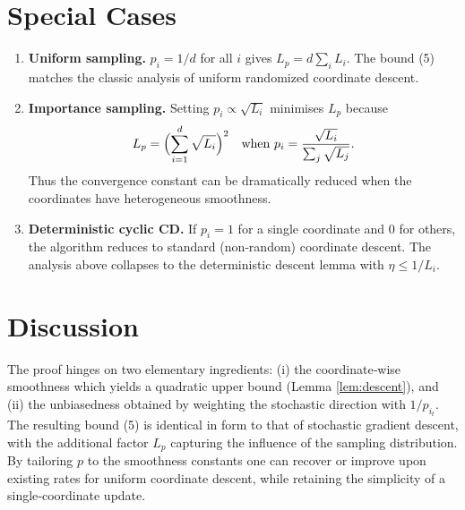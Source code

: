 \documentclass{article}
\begin{document}
\section*{Special Cases}
\begin{enumerate}[label=(\alph*)]
\item \textbf{Uniform sampling.} $p_i=1/d$ for all $i$ gives $L_{p}=d\sum_i L_i$. The bound (5) matches the classic analysis of uniform randomized coordinate descent.
\item \textbf{Importance sampling.} Setting $p_i\propto\sqrt{L_i}$ minimises $L_{p}$ because
\[
L_{p}=\Bigl(\sum_{i=1}^{d}\sqrt{L_i}\Bigr)^{2}
\quad\text{when }p_i=\frac{\sqrt{L_i}}{\sum_j\sqrt{L_j}}.
\]
Thus the convergence constant can be dramatically reduced when the coordinates have heterogeneous smoothness.
\item \textbf{Deterministic cyclic CD.} If $p_i=1$ for a single coordinate and $0$ for others, the algorithm reduces to standard (non‑random) coordinate descent. The analysis above collapses to the deterministic descent lemma with $\eta\le 1/L_i$.
\end{enumerate}

\section*{Discussion}
The proof hinges on two elementary ingredients: (i) the coordinate‑wise smoothness which yields a quadratic upper bound (Lemma \ref{lem:descent}), and (ii) the unbiasedness obtained by weighting the stochastic direction with $1/p_{i_t}$. The resulting bound (5) is identical in form to that of stochastic gradient descent, with the additional factor $L_{p}$ capturing the influence of the sampling distribution. By tailoring $p$ to the smoothness constants one can recover or improve upon existing rates for uniform coordinate descent, while retaining the simplicity of a single‑coordinate update.
\end{document}
